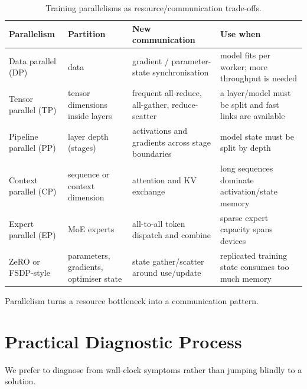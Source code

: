 \begin{table}[H]
\centering
\footnotesize
\caption{Training parallelisms as resource/communication trade-offs.}
\label{tab:parallelisms}
\begin{tabularx}{\textwidth}{@{}>{\raggedright\arraybackslash}p{2.15cm}>{\raggedright\arraybackslash}p{2.15cm}>{\raggedright\arraybackslash}X>{\raggedright\arraybackslash}X@{}}
\toprule
\textbf{Parallelism} & \textbf{Partition} & \textbf{New communication} & \textbf{Use when} \\
\midrule
Data parallel (DP) & data & gradient / parameter-state synchronisation & model fits per worker; more throughput is needed \\
Tensor parallel (TP) & tensor dimensions inside layers & frequent all-reduce, all-gather, reduce-scatter & a layer/model must be split and fast links are available \\
Pipeline parallel (PP) & layer depth (stages) & activations and gradients across stage boundaries & model state must be split by depth \\
Context parallel (CP) & sequence or context dimension & attention and KV exchange & long sequences dominate activation/state memory \\
Expert parallel (EP) & MoE experts & all-to-all token dispatch and combine & sparse expert capacity spans devices \\
ZeRO or FSDP-style & parameters, gradients, optimiser state & state gather/scatter around use/update & replicated training state consumes too much memory \\
\bottomrule
\end{tabularx}
\end{table}


\begin{calloutmemoryhook}
Parallelism turns a resource bottleneck into a communication pattern.
\end{calloutmemoryhook}



\section{Practical Diagnostic Process}
\label{sec:hardware-diagnostic}
We prefer to diagnose from wall-clock symptoms rather than jumping blindly to a solution.


